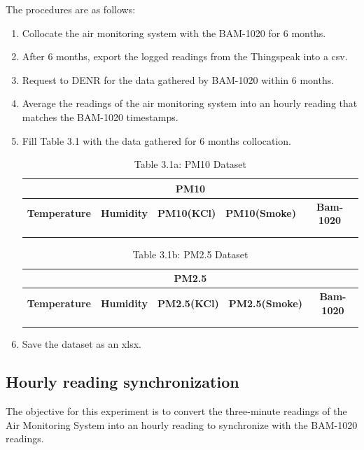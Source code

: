 \noindent The procedures are as follows:
\begin{enumerate}
	\item Collocate the air monitoring system with the BAM-1020 for 6 months.
	\item After 6 months, export the logged readings from the Thingspeak into a csv.
	\item Request to DENR for the data gathered by BAM-1020 within 6 months.
	\item Average the readings of the air monitoring system into an hourly reading that matches the BAM-1020 timestamps.
	\item Fill Table 3.1 with the data gathered for 6 months collocation.
	
	\begin{table}[htbp]
		\centering
		\renewcommand{\arraystretch}{1.3}
		\begin{tabular}{|c|c|c|c|c|}
			\hline
			\multicolumn{5}{|c|}{\textbf{PM10}} \\ \hline
			\textbf{Temperature} & \textbf{Humidity} & \textbf{PM10(KCl)} & \textbf{PM10(Smoke)} & \textbf{Bam-1020} \\ \hline
			& & & & \\ \hline
			& & & & \\ \hline
		\end{tabular}
		\caption{Table 3.1a: PM10 Dataset}
		\label{tab:collocation_pm10}
	\end{table}
	
	\begin{table}[htbp]
		\centering
		\renewcommand{\arraystretch}{1.3}
		\begin{tabular}{|c|c|c|c|c|}
			\hline
			\multicolumn{5}{|c|}{\textbf{PM2.5}} \\ \hline
			\textbf{Temperature} & \textbf{Humidity} & \textbf{PM2.5(KCl)} & \textbf{PM2.5(Smoke)} & \textbf{Bam-1020} \\ \hline
			& & & & \\ \hline
			& & & & \\ \hline
		\end{tabular}
		\caption{Table 3.1b: PM2.5 Dataset}
		\label{tab:collocation_pm25}
	\end{table}
	
	\item Save the dataset as an xlsx.
\end{enumerate}

\subsection{Hourly reading synchronization}
The objective for this experiment is to convert the three-minute readings of the Air Monitoring System into an hourly reading to synchronize with the BAM-1020 readings.

